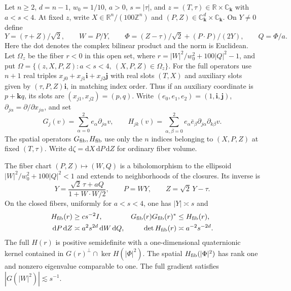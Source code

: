 Let $n\ge2$, $d=n-1$, $w_0=1/10$, $a>0$, $s=|\tau|$, and $z=(T,\tau)\in\mathbb R\times\mathbb C_{\mathbf k}$ with $a<s<4$. At fixed $z$, write $X\in\mathbb R^n/(100\mathbb Z^n)$ and $(P,Z)\in\mathbb C_{\mathbf k}^d\times\mathbb C_{\mathbf k}$. On $Y\ne0$ define
\[
 Y=(\tau+Z)/\sqrt 2,\qquad W=P/Y,\qquad
 \Phi=(Z-\tau)/\sqrt 2+(P\cdot P)/(2Y),\qquad Q=\Phi/a .
\]
Here the dot denotes the complex bilinear product and the norm is Euclidean. Let $\Omega_z$ be the fiber $r<0$ in this open set, where $r=|W|^2/w_0^2+100|Q|^2-1$, and put
$\Omega=\{(z,X,P,Z):a<s<4,\ (X,P,Z)\in\Omega_z\}$. For the full operators use $n+1$ real triples $x_{j0}+x_{j1}\mathbf i+x_{j2}\mathbf j$ with real slots $(T,X)$ and auxiliary slots given by $(\tau,P,Z)\mathbf i$, in matching index order. Thus if an auxiliary coordinate is $p+\mathbf kq$, its slots are $(x_{j1},x_{j2})=(p,q)$. Write $(e_0,e_1,e_2)=(1,\mathbf i,\mathbf j)$, $\partial_{j\alpha}=\partial/\partial x_{j\alpha}$, and set
\[
G_j(v)=\sum_{\alpha=0}^2 e_\alpha\partial_{j\alpha}v,\qquad
H_{jk}(v)=\sum_{\alpha,\beta=0}^2 e_\alpha\bar e_\beta\partial_{j\alpha}\partial_{k\beta}v.
\]
The spatial operators $G_{\rm fib},H_{\rm fib}$ use only the $n$ indices belonging to $(X,P,Z)$ at fixed $(T,\tau)$. Write $\mathrm d\zeta=\mathrm dX\,\mathrm dP\,\mathrm dZ$ for ordinary fiber volume.

The fiber chart $(P,Z)\mapsto(W,Q)$ is a biholomorphism to the ellipsoid $|W|^2/w_0^2+100|Q|^2<1$ and extends to neighborhoods of the closures. Its inverse is
\[
 Y=\frac{\sqrt 2\,\tau+aQ}{1+W\cdot W/2},\qquad P=WY,\qquad Z=\sqrt 2\,Y-\tau .
\]
On the closed fibers, uniformly for $a<s<4$, one has $|Y|\asymp s$ and
\begin{align*}
 H_{\rm fib}(r)&\ge c s^{-2}I,
 &G_{\rm fib}(r)G_{\rm fib}(r)^*&\le H_{\rm fib}(r),\\
 \mathrm dP\,\mathrm dZ&\asymp a^2s^{2d}\,\mathrm dW\,\mathrm dQ,
 &\det H_{\rm fib}(r)&\asymp a^{-2}s^{-2d}.
\end{align*}
The full $H(r)$ is positive semidefinite with a one-dimensional quaternionic kernel contained in $G(r)^\perp\cap\ker H(|\Phi|^2)$. The spatial $H_{\rm fib}(|\Phi|^2)$ has rank one and nonzero eigenvalue comparable to one. The full gradient satisfies $|G(|W|^2)|\lesssim s^{-1}$.
